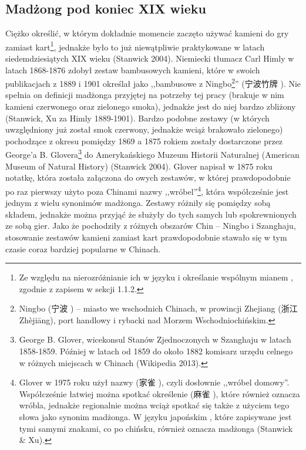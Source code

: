 \subsection{Madżong pod koniec XIX wieku}
Ciężko określić, w którym dokładnie momencie zaczęto używać kamieni do gry
zamiast kart\footnote{Ze względu na nierozróżnianie ich w języku i określanie
wspólnym mianem , zgodnie z zapisem w sekcji 1.1.2.}, jednakże było
to już niewątpliwie praktykowane w latach siedemdziesiątych XIX wieku (Stanwick
2004). Niemiecki tłumacz Carl Himly w latach 1868-1876 zdobył zestaw bambusowych
kamieni, które w swoich publikacjach z 1889 i 1901 określał jako ,,bambusowe
 z Ningbo\footnote{Ningbo (宁波 ) -- miasto we
wschodnich Chinach, w prowincji Zhejiang (浙江 Zhèjiāng), port handlowy i rybacki
nad Morzem Wschodniochińskim.}'' (宁波竹牌 ). Nie spełnia on
definicji madżonga przyjętej na potrzeby tej pracy (brakuje w nim kamieni
czerwonego oraz zielonego smoka), jednakże jest do niej bardzo zbliżony
(Stanwick, Xu za Himly 1889-1901). Bardzo podobne zestawy (w których
uwzględniony już został smok czerwony, jednakże wciąż brakowało zielonego)
pochodzące z okresu pomiędzy 1869 a 1875 rokiem zostały dostarczone przez
George'a B. Glovera\footnote{George B. Glover, wicekonsul Stanów Zjednoczonych w
Szanghaju w latach 1858-1859. Później w latach od 1859 do około 1882 komisarz
urzędu celnego w różnych miejscach w Chinach (Wikipedia 2013).} do
Amerykańskiego Muzeum Historii Naturalnej (American Museum of Natural History)
(Stanwick 2004). Glover napisał w 1875 roku notatkę, która została załączona do
owych zestawów, w której prawdopodobnie po raz pierwszy użyto poza Chinami nazwy
,,wróbel''\footnote{Glover w 1975 roku użył nazwy  (家雀
), czyli dosłownie ,,wróbel domowy''. Współcześnie łatwiej można
spotkać określenie  (麻雀 ), które również oznacza
wróbla, jednakże regionalnie można wciąż spotkać się także z użyciem tego słowa
jako synonim madżonga. W języku japońskim , które zapisywane jest
tymi samymi znakami, co  po chińsku, również oznacza madżonga
(Stanwick \& Xu).}, która współcześnie jest jednym z wielu synonimów madżonga.
Zestawy różniły się pomiędzy sobą składem, jednakże można przyjąć że służyły do
tych samych lub spokrewnionych ze sobą gier. Jako że pochodziły z różnych
obszarów Chin -- Ningbo i Szanghaju, stosowanie zestawów kamieni zamiast kart
prawdopodobnie stawało się w tym czasie coraz bardziej popularne w Chinach.

